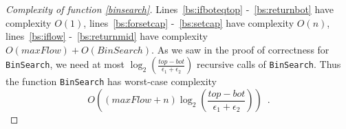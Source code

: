 \begin{proof}[Complexity of function \ref{binsearch}]
  Lines~\ref{bs:ifboteqtop} -~\ref{bs:returnbot} have complexity $O\left(1\right)$, lines~\ref{bs:forsetcap}
  -~\ref{bs:setcap} have complexity $O\left(n\right)$, lines~\ref{bs:iflow} -~\ref{bs:returnmid} have complexity
  $O\left(maxFlow\right) + O\left(BinSearch\right)$. As we saw in the proof of correctness for \texttt{BinSearch}, we need
  at most $\log_2\left(\frac{top - bot}{\epsilon_1 + \epsilon_2}\right)$ recursive calls of \texttt{BinSearch}. Thus the
  function \texttt{BinSearch} has worst-case complexity
  \begin{equation*}
    O\left(\left(maxFlow + n\right)\log_2\left(\frac{top - bot}{\epsilon_1 + \epsilon_2}\right)\right) \enspace.
  \end{equation*}
\end{proof}
